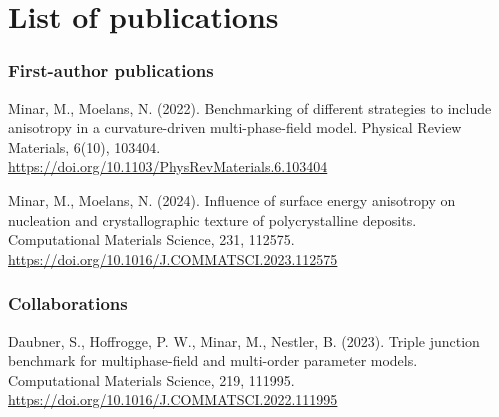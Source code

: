 \chapter{List of publications}
\subsection*{First-author publications}
	\cite{Minar2022} Minar, M., Moelans, N. (2022). Benchmarking of different strategies to include anisotropy in a curvature-driven multi-phase-field model. Physical Review Materials, 6(10), 103404. \\
	\url{https://doi.org/10.1103/PhysRevMaterials.6.103404}
	
	\cite{Minar2024} Minar, M., Moelans, N. (2024). Influence of surface energy anisotropy on nucleation and crystallographic texture of polycrystalline deposits. Computational Materials Science, 231, 112575. \\
	\url{https://doi.org/10.1016/J.COMMATSCI.2023.112575}
	
\subsection*{Collaborations}
	\cite{Daubner2023} Daubner, S., Hoffrogge, P. W., Minar, M., Nestler, B. (2023). Triple junction benchmark for multiphase-field and multi-order parameter models. Computational Materials Science, 219, 111995. \\
	\url{https://doi.org/10.1016/J.COMMATSCI.2022.111995}
